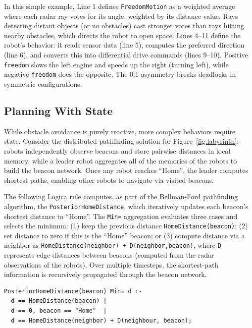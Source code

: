 \documentclass[sigconf]{acmart}
\begin{document}
\noindent 
In this simple example, Line 1 defines \texttt{FreedomMotion} as a weighted average where each radar ray votes for its angle, weighted by its distance value. Rays detecting distant objects (or no obstacles) cast stronger votes than rays hitting nearby obstacles, 
which directs the robot to open space.
Lines 4--11 define the robot's behavior: it reads sensor data (line 5), computes the preferred direction (line 6), and converts this into differential drive commands (lines 9--10). Positive \texttt{freedom} slows the left engine and speeds up the right (turning left), while negative \texttt{freedom} does the opposite. The 0.1 asymmetry breaks deadlocks in symmetric configurations.

\vspace{-3pt}
\subsection{Planning With State}
While obstacle avoidance is purely reactive, more complex behaviors require state. Consider the distributed pathfinding solution for Figure~\ref{fig:labyrinth}: robots independently observe beacons and store pairwise distances in local memory, while a leader robot aggregates all of the memories of the robots to build the beacon network. Once any robot reaches ``Home'', the leader computes shortest paths, enabling other robots to navigate via visited beacons. 

The following Logica rule computes, as part of the Bellman-Ford pathfinding algorithm, the \verb|PosteriorHomeDistance|, which iteratively updates each beacon's shortest distance to ``Home''. The \verb|Min=| aggregation evaluates three cases and selects the minimum: (1) keep the previous distance \verb|HomeDistance(beacon)|; (2) set distance to zero if this is the ``Home'' beacon; or (3) compute distance via a neighbor as \verb|HomeDistance(neighbor) + D(neighbor,beacon)|, where \verb|D| represents edge distances between beacons (computed from the radar observations of the robots). Over multiple timesteps, the shortest-path information is recursively propagated through the beacon network.

% 
\pagebreak

\begin{lstlisting}[language=LOGICA2]
PosteriorHomeDistance(beacon) Min= d :-
  d == HomeDistance(beacon) |
  d == 0, beacon == "Home"  |
  d == HomeDistance(neighbor) + D(neighbour, beacon);

\end{lstlisting}
\end{document}
